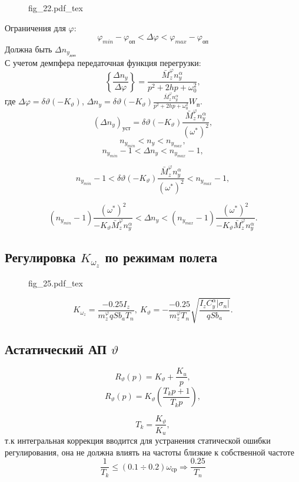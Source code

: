 \documentclass{article}
\begin{document}
\begin{figure}[H]
    \centering
    {fig_22.pdf_tex}
\end{figure}

Ограничения для $\varphi$:
\[ \varphi_{min} - \varphi_\text{оп} < \Delta \varphi < \varphi_{max} -
\varphi_\text{оп}\]
Должна быть $\Delta n_{y_\text{доп}}$\\
С учетом демпфера передаточная функция перегрузки:
\[
    \left\{\frac{\Delta n_y}{\Delta \varphi}\right\} = \frac{\bar{M}_z^\varphi
    n_y^\alpha}{p^2 + 2hp + \omega_0^2},
\]
где $\Delta \varphi = \delta \vartheta (-K_\vartheta)$, $\Delta n_y = \delta
\vartheta (-K_\vartheta ) \frac{\bar{M}_z^\varphi n_y^\alpha}{p^2 + 2hp +
\omega_0^2}W_\text{п}$.
\[
    (\Delta n_y)_\text{уст} = \delta \vartheta (-
    K_\vartheta)\frac{\bar{M}_z^\varphi n_y^\alpha}{(\omega^*)^2},
\]
\[
    n_{{y}_{min}} < n_y < n_{{y}_{max}},
\]
\[
    n_{{y}_{min}} - 1< \Delta n_y < n_{{y}_{max}} - 1,
\]

\[
    n_{{y}_{min}} - 1<  \delta \vartheta (- K_\vartheta)\frac{\bar{M}_z^\varphi
    n_y^\alpha}{(\omega^*)^2} < n_{{y}_{max}} - 1,
\]

\[
    (n_{{y}_{min}} - 1)\frac{(\omega^*)^2}{-K_{\vartheta}\bar{M}_z^\varphi
    n_y^\alpha}< \Delta n_y< (n_{{y}_{max}} - 1)
    \frac{(\omega^*)^2}{-K_{\vartheta}\bar{M}_z^\varphi n_y^\alpha}.
\]

\subsection{Регулировка \texorpdfstring{$K_{\omega_z}$}{Lg} по режимам полета}
\begin{figure}[H]
    \centering
    {fig_25.pdf_tex}
\end{figure}
\[
    K_{\omega_z}  =\frac{-0.25 I_z}{m_z^\varphi q S b_a T_n}, \ K_{\vartheta}
    = - \frac{-0.25}{m_z^\varphi T_n} \sqrt{\frac{I_z C_y^\alpha
    |\sigma_n|}{qSb_a}}.
\]

\subsection{Астатический АП \texorpdfstring{$\vartheta$}{Lg}}
\[
    R_{\vartheta}(p) = K_\vartheta + \frac{K_u}{p},
\]
\[
    R_{\vartheta}(p) = K_\vartheta(\frac{T_k p  + 1 }{T_k p}),
\]

\[
    T_k = \frac{K_\vartheta}{K_u},
\]
т.к интегральная коррекция вводится для устранения статической ошибки
регулирования, она не должна влиять на частоты близкие к собственной частоте
\[
    \frac{1}{T_k} \leq (0.1 \div 0.2) \omega_\text{ср} \Rightarrow
    \frac{0.25}{T_n}
\]
\end{document}
